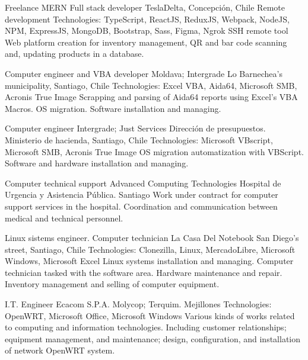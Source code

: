 \documentclass[draft,color,12pt,letterpaper,sans]{moderncv}
\begin{document}
{Freelance MERN Full stack developer}
{TeslaDelta, Concepci\'on, Chile}
{\newline Remote development}
{\newline Technologies: TypeScript, ReactJS, ReduxJS, Webpack, NodeJS, NPM, ExpressJS, MongoDB, Bootstrap, Sass, Figma, Ngrok SSH remote tool}
{Web platform creation for inventory management, QR and bar code scanning and, updating products in a database.\newline}

{Computer engineer and VBA developer}
{Moldava; Intergrade}
{Lo Barnechea's municipality, Santiago, Chile}
{\newline Technologies: Excel VBA, Aida64, Microsoft SMB, Acronis True Image}
{Scrapping and parsing of Aida64 reports using Excel's VBA Macros. OS migration. Software installation and managing.\newline}


{Computer engineer}
{Intergrade; Just Services}
{Direcci\'on de presupuestos. Ministerio de hacienda, Santiago, Chile}
{\newline Technologies: Microsoft VBscript, Microsoft SMB, Acronis True Image}
{OS migration automatization with VBScript. Software and hardware installation and managing.\newline}

{Computer technical support}
{Advanced Computing Technologies}
{Hospital de Urgencia y Asistencia P\'ublica. Santiago}
{}
{Work under contract for computer support services in the hospital. Coordination and communication between medical and technical personnel.\newline}

{Linux sistems engineer. Computer technician}
{La Casa Del Notebook}
{San Diego's street, Santiago, Chile}
{\newline Technologies: Clonezilla, Linux, MercadoLibre, Microsoft Windows, Microsoft Excel}
{Linux systems installation and managing. Computer technician tasked with the software area. Hardware maintenance and repair. Inventory management and selling of computer equipment.\newline} 

{I.T. Engineer}
{Ecacom S.P.A.}
{Molycop; Terquim. Mejillones}
{\newline Technologies: OpenWRT, Microsoft Office, Microsoft Windows}
{Various kinds of works related to computing and information technologies. Including customer relationships; equipment management, and maintenance; design, configuration, and installation of network OpenWRT system.\newline}
\end{document}
